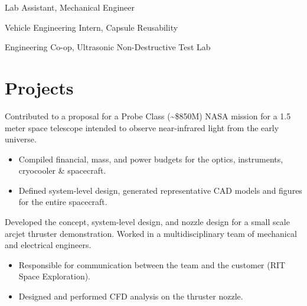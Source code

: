 \documentclass{resume}
\begin{document}
Lab Assistant, Mechanical Engineer

Vehicle Engineering Intern, Capsule Reusability

Engineering Co-op, Ultrasonic Non-Destructive Test Lab


\section{Projects}
Contributed to a proposal for a Probe Class (\textasciitilde\$850M) NASA mission for a 1.5
meter space telescope intended to observe near-infrared light from the early
universe.
\begin{itemize}
  \item Compiled financial, mass, and power budgets for the optics, instruments,
    cryocooler \& spacecraft.
  \item Defined system-level design, generated representative CAD models and
    figures for the entire spacecraft.
\end{itemize}

Developed the concept, system-level design, and nozzle design for a small scale
arcjet thruster demonstration. Worked in a multidisciplinary team of mechanical and electrical engineers.
\begin{itemize}
  \item Responsible for communication between the team and the customer (RIT Space Exploration).
  \item Designed and performed CFD analysis on the thruster nozzle.
\end{itemize}
\end{document}
